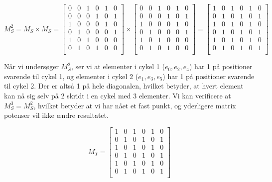 \documentclass[a4paper,12pt]{article}
\begin{document}
\[M^2_S = M_S \times M_S = 
\begin{bmatrix}
    0 & 0 & 1 & 0 & 1 & 0 \\
    0 & 0 & 0 & 1 & 0 & 1 \\
    1 & 0 & 0 & 0 & 1 & 0 \\
    0 & 1 & 0 & 0 & 0 & 1 \\
    1 & 0 & 1 & 0 & 0 & 0 \\
    0 & 1 & 0 & 1 & 0 & 0 \\
\end{bmatrix}
\times
\begin{bmatrix}
    0 & 0 & 1 & 0 & 1 & 0 \\
    0 & 0 & 0 & 1 & 0 & 1 \\
    1 & 0 & 0 & 0 & 1 & 0 \\
    0 & 1 & 0 & 0 & 0 & 1 \\
    1 & 0 & 1 & 0 & 0 & 0 \\
    0 & 1 & 0 & 1 & 0 & 0 \\
\end{bmatrix}
=
\begin{bmatrix}
    1 & 0 & 1 & 0 & 1 & 0 \\
    0 & 1 & 0 & 1 & 0 & 1 \\
    1 & 0 & 1 & 0 & 1 & 0 \\
    0 & 1 & 0 & 1 & 0 & 1 \\
    1 & 0 & 1 & 0 & 1 & 0 \\
    0 & 1 & 0 & 1 & 0 & 1 \\
\end{bmatrix}\]

Når vi undersøger $M^2_S$, ser vi at elementer i cykel 1 ($e_0, e_2, e_4$) har 1 på positioner svarende til cykel 1, og elementer i cykel 2 ($e_1, e_3, e_5$) har 1 på positioner svarende til cykel 2. Der er altså 1 på hele diagonalen, hvilket betyder, at hvert element kan nå sig selv på 2 skridt i en cykel med 3 elementer. Vi kan verificere at $M^3_S = M^2_S$, hvilket betyder at vi har nået et fast punkt, og yderligere matrix potenser vil ikke ændre resultatet.

\[M_T = 
\begin{bmatrix}
    1 & 0 & 1 & 0 & 1 & 0 \\
    0 & 1 & 0 & 1 & 0 & 1 \\
    1 & 0 & 1 & 0 & 1 & 0 \\
    0 & 1 & 0 & 1 & 0 & 1 \\
    1 & 0 & 1 & 0 & 1 & 0 \\
    0 & 1 & 0 & 1 & 0 & 1 \\
\end{bmatrix}\]
\end{document}
